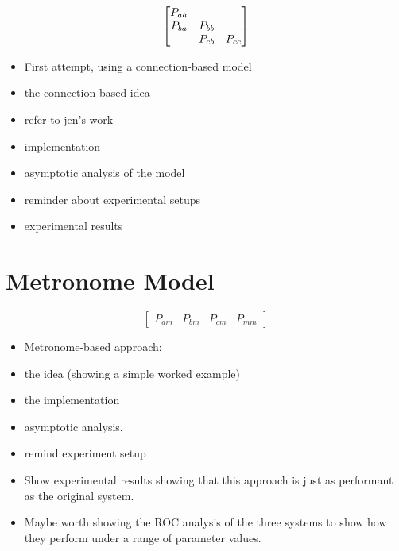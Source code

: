 \documentclass[11pt, a4paper]{report}
\begin{document}
\[
\begin{bmatrix}
  P_{aa} & \empty & \empty\\
  P_{ba} & P_{bb} & \empty\\
  \empty & P_{cb} & P_{cc}
\end{bmatrix}
\]


\begin{itemize}
\item First attempt, using a connection-based model
\item the connection-based idea
\item refer to jen's work
\item implementation
\item asymptotic analysis of the model
\item reminder about experimental setups
\item experimental results
\end{itemize}

\chapter{Metronome Model}
\label{cha:metronome-model}

%
%
\[
\begin{bmatrix}
  P_{am} & P_{bm} & P_{cm} & P_{mm}
\end{bmatrix}
\]

\begin{itemize}
\item Metronome-based approach:
\item the idea (showing a simple worked
  example)
\item the implementation
\item asymptotic analysis.
\item remind experiment setup
\item Show experimental results showing that this approach is just as
  performant as the original system.
\item Maybe worth showing the ROC analysis of the three systems to show
  how they perform under a range of parameter values.
\end{itemize}

\end{document}
